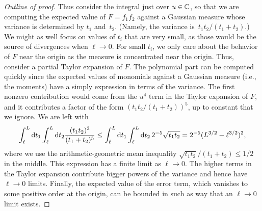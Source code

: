 \begin{proof}[Outline of proof]
Thus consider the integral just over $u \in \mathbb C$,
so that we are computing the expected value of $F=f_1 f_2$ against a Gaussian measure 
whose variance is determined by $t_1$ and~$t_2$.
(Namely, the variance is~$t_1 t_2/(t_1+t_2)$.)
We might as well focus on values of $t_i$ that are very small, 
as those would be the source of divergences when $\ell \to 0$.
For small $t_i$, we only care about the behavior of $F$ near the origin as the measure is concentrated near the origin.
Thus, consider a partial Taylor expansion of $F$.
The polynomial part can be computed quickly since the expected values of monomials against a Gaussian measure (i.e., the moments) have a simply expression in terms of the variance.
The first nonzero contribution would come from the $u^4$ term in the Taylor expansion of $F$,
and it contributes a factor of the form $(t_1 t_2/(t_1+t_2))^5$,
up to constant that we ignore.
We are left with
\[
\int_{\ell}^L {\rm d} t_1 \int_{\ell}^L {\rm d} t_2 \frac{(t_1t_2)^{3}}{(t_1 + t_2)^{5}} 
\leq \int_{\ell}^L {\rm d} t_1 \int_{\ell}^L {\rm d} t_2 \, 2^{-5}\sqrt{t_1t_2} 
= 2^{-5}(L^{3/2} - {\ell}^{3/2})^2,
\]
where we use the arithmetic-geometric mean inequality $\sqrt{t_1t_2}/(t_1+t_2)\leq 1/2$ in the middle.
This expression has a finite limit as $\ell \to 0$.
The higher terms in the Taylor expansion contribute bigger powers of the variance 
and hence have $\ell \to 0$ limits.
Finally, the expected value of the error term, 
which vanishes to some positive order at the origin,
can be bounded in such as way that an $\ell \to 0$ limit exists.
\end{proof}

 
%
%


